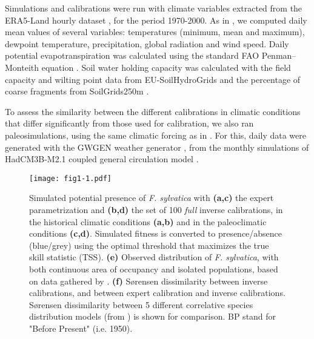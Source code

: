 \documentclass[preprint,12pt,authoryear]{elsarticle}
\begin{document}
Simulations and calibrations were run with climate variables extracted from the ERA5-Land hourly dataset \citep{MunozSabater2021}, for the period 1970-2000. As in \citet{VanderMeersch2023}, we computed daily mean values of several variables: temperatures (minimum, mean and maximum), dewpoint temperature, precipitation, global radiation and wind speed. Daily potential evapotranspiration was calculated using the standard FAO Penman–Monteith equation \citep{Allen1998}. Soil water holding capacity was calculated with the field capacity and wilting point data from EU-SoilHydroGrids \citep{Toth2017} and the percentage of coarse fragments from SoilGrids250m \citep{Hengl2017}.

To assess the similarity between the different calibrations in climatic conditions that differ significantly from those used for calibration, we also ran paleosimulations, using the same climatic forcing as in \citet{VanderMeersch2025}. For this, daily data were generated with the GWGEN \textcolor{customred}{weather} generator \citep{Sommer2017}, from the monthly simulations of HadCM3B-M2.1 coupled general circulation model \citep{Armstrong2019}.

\begin{figure}
\begin{subcaptiongroup}
\label{fig:1A} 
\label{fig:1B}
\label{fig:1C}
\label{fig:1D}
\label{fig:1E}
\label{fig:1F}
\end{subcaptiongroup}
\centerline{\texttt{[image: fig1-1.pdf]}}
\caption{Simulated potential presence of \emph{F. sylvatica} with \textbf{(a,c)} the expert parametrization and \textbf{(b,d)} the set of 100 \emph{full} inverse calibrations, in the historical climatic conditions \textbf{(a,b)} and in the paleoclimatic conditions \textbf{(c,d)}. Simulated fitness is converted to presence/absence (blue/grey) using the optimal threshold that maximizes the true skill statistic (TSS). 
\textcolor{customred}{\textbf{(e)} Observed distribution of \emph{F. sylvatica}, with both continuous area of occupancy and isolated populations, based on data gathered by \citet{Caudullo2017}.}
\textbf{(f)} S\o rensen dissimilarity between inverse calibrations, and between expert calibration and inverse calibrations. S\o rensen dissimilarity between 5 different correlative species distribution models (from \citealp{VanderMeersch2025}) is shown for comparison. BP stand for "Before Present" (i.e. 1950).}
\label{fig:1}
\end{figure}
\end{document}

